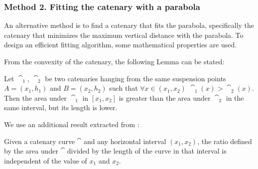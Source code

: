 \medspace



\subsubsection{Method 2. Fitting the catenary with a parabola}
\label{sec:approxfitting}
An alternative method is to find a catenary that fits the parabola, specifically the catenary that minimizes the maximum vertical distance with the parabola. To design an efficient fitting algorithm, some mathematical properties are used.

From the convexity of the catenary, the following Lemma can be stated:
\begin{lemma}
\label{le:big_area_small_length}
    Let $\cat_1$, $\cat_2$ be two catenaries hanging from the same suspension points $A=(x_1, h_1)$ and $B=(x_2, h_2)$ such that $\forall x\in (x_1, x_2)$ $\cat_1(x)> \cat_2(x)$. Then the area under $\cat_1$ in $[x_1, x_2]$ is greater than the area under $\cat_2$ in the same interval, but its length is lower.
\end{lemma}

We use an additional result extracted from \cite{parker2010property}:
\begin{theorem}
\label{theo:cool_cat_property}
    Given a catenary curve $\cat$ and any horizontal interval $(x_1, x_2)$, the ratio defined by the area under $\cat$ divided by the length of the curve in that interval is independent of the value of $x_1$ and $x_2$.
\end{theorem}

